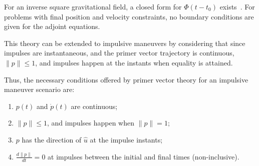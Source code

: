 For an inverse square gravitational field, a closed form for \(\Phi(t-t_0)\) exists~\cite{glandorf_transition_matrix}. For problems with final position and velocity constraints, no boundary conditions are given for the adjoint equations.


This theory can be extended to impulsive maneuvers by considering that since impulses are instantaneous, and the primer vector trajectory is continuous, \(\lVert p \rVert \leq 1\), and impulses happen at the instants when equality is attained.

Thus, the necessary conditions offered by primer vector theory for an impulsive maneuver scenario are:
\begin{enumerate}
    \item \(p(t)\) and \(\dot p(t)\) are continuous;
    \item \(\lVert p \rVert \leq 1\), and impulses happen when \(\lVert p \rVert = 1\);
    \item \(p\) has the direction of \(\hat u\) at the impulse instants;
    \item \(\frac{d \lVert p \rVert}{dt} = 0\) at impulses between the initial and final times (non-inclusive).
\end{enumerate}